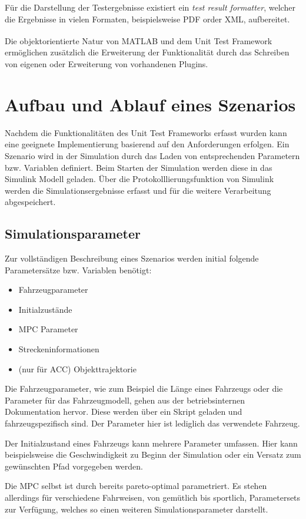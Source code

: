 Für die Darstellung der Testergebnisse existiert ein \textit{test result formatter}, welcher die Ergebnisse in vielen Formaten, beispielsweise PDF order XML, aufbereitet.

Die objektorientierte Natur von MATLAB\textsuperscript{\textregistered} und dem Unit Test Framework ermöglichen zusätzlich die Erweiterung der Funktionalität durch das Schreiben von eigenen oder Erweiterung von vorhandenen Plugins.

\section{Aufbau und Ablauf eines Szenarios} \label{sec:AufbauSzenario}

Nachdem die Funktionalitäten des Unit Test Frameworks erfasst wurden kann eine geeignete Implementierung basierend auf den Anforderungen erfolgen. Ein Szenario wird in der Simulation durch das Laden von entsprechenden Parametern bzw. Variablen definiert. Beim Starten der Simulation werden diese in das Simulink Modell geladen. Über die Protokolllierungsfunktion von Simulink werden die Simulationsergebnisse erfasst und für die weitere Verarbeitung abgespeichert.

\subsection{Simulationsparameter}
Zur vollständigen Beschreibung eines Szenarios werden initial folgende Parametersätze bzw. Variablen benötigt:
\begin{itemize}
	\item Fahrzeugparameter
	\item Initialzustände
	\item MPC Parameter
	\item Streckeninformationen
	\item (nur für ACC) Objekttrajektorie
\end{itemize}
Die Fahrzeugparameter, wie zum Beispiel die Länge eines Fahrzeugs oder die Parameter für das Fahrzeugmodell, gehen aus der betriebsinternen Dokumentation hervor. Diese werden über ein Skript geladen und fahrzeugspezifisch sind. Der Parameter hier ist lediglich das verwendete Fahrzeug.

Der Initialzustand eines Fahrzeugs kann mehrere Parameter umfassen. Hier kann beispielsweise die Geschwindigkeit zu Beginn der Simulation oder ein Versatz zum gewünschten Pfad vorgegeben werden.

Die MPC selbst ist durch \cite{math11020465} bereits pareto-optimal parametriert. Es stehen allerdings für verschiedene Fahrweisen, von gemütlich bis sportlich, Parametersets zur Verfügung, welches so einen weiteren Simulationsparameter darstellt.


